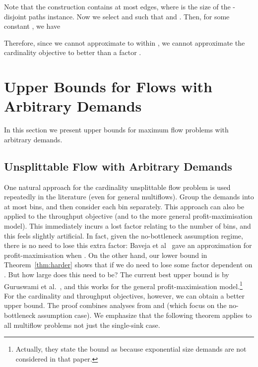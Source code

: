\documentclass[12pt]{article}
\newcommand{\qed}{}
\begin{document}
Note that the construction contains at most  edges, where  is the size of the -disjoint paths instance.
Now we select  and  such that  and .
Then, for some constant , we have

Therefore, since we cannot approximate to within , we cannot
approximate the cardinality objective to better than a factor . \qed





























\section{Upper Bounds for Flows with Arbitrary Demands}\label{sec:upper}

In this section we present upper bounds for maximum flow problems with arbitrary demands.

\subsection{Unsplittable Flow with Arbitrary Demands}\label{sec:upper-unsplittable}

One natural approach for the cardinality unsplittable flow problem is used repeatedly in the
literature  (even for general multiflows). Group the demands
into at most  bins, and then consider
each bin separately. This approach can also be applied to the throughput objective (and to the
more general profit-maximisation model).
This immediately incurs a lost factor relating to the number of bins, and this
feels slightly artificial. In fact, given the no-bottleneck assumption regime, there is no need to lose this extra factor:
Baveja et al~\cite{baveja2000approximation} gave
an  approximation for profit-maximisation when .
On the other hand, our lower bound in Theorem~\ref{thm:harder} shows that if   we do need to
lose some factor dependent on . But how large does this need to be?
The current best upper bound is  by Guruswami et al.~\cite{guruswami2003near},
and this works for the general profit-maximisation model.\footnote{Actually, they state the bound as  because
exponential size demands are not considered in that paper.}
For the cardinality and throughput objectives, however, we can obtain a better upper bound.
The proof combines analyses from \cite{baveja2000approximation} and \cite{kolliopoulos2004approximating}
(which focus on the no-bottleneck assumption case). We emphasize that the following theorem
applies to all multiflow problems not just the single-sink case.\\
\end{document}
